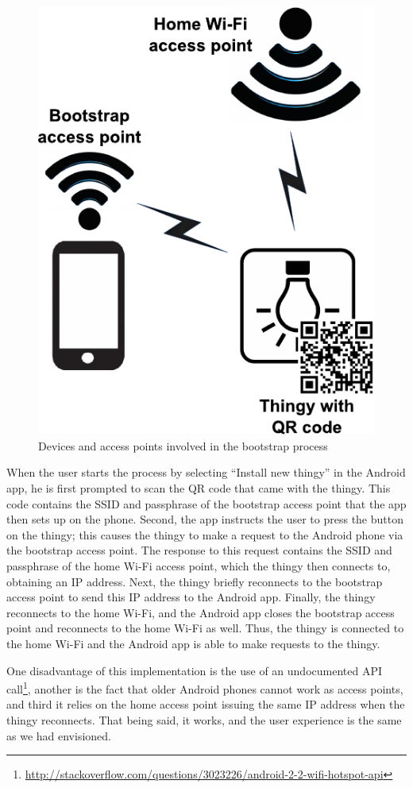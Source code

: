 \documentclass{ubicomp2012}
\begin{document}
\begin{figure}[th]
\begin{center}
\includegraphics[width=0.70\columnwidth]{figures/bootstrap-drawing.pdf}
\end{center}
\caption{Devices and access points involved in the bootstrap process}
\label{fig:bootstrapDraw}
\end{figure}

When the user starts the process by selecting ``Install new thingy'' in the Android app, he is first prompted to scan the QR code that came with the thingy. This code contains the SSID and passphrase of the bootstrap access point that the app then sets up on the phone. Second, the app instructs the user to press the button on the thingy; this causes the thingy to make a request to the Android phone via the bootstrap access point. The response to this request contains the SSID and passphrase of the home Wi-Fi access point, which the thingy then connects to, obtaining an IP address. Next, the thingy briefly reconnects to the bootstrap access point to send this IP address to the Android app. Finally, the thingy reconnects to the home Wi-Fi, and the Android app closes the bootstrap access point and reconnects to the home Wi-Fi as well. Thus, the thingy is connected to the home Wi-Fi and the Android app is able to make requests to the thingy.

One disadvantage of this implementation is the use of an undocumented API call\footnote{\url{http://stackoverflow.com/questions/3023226/android-2-2-wifi-hotspot-api}}, another is the fact that older Android phones cannot work as access points, and third it relies on the home access point issuing the same IP address when the thingy reconnects. That being said, it works, and the user experience is the same as we had envisioned.
\end{document}
